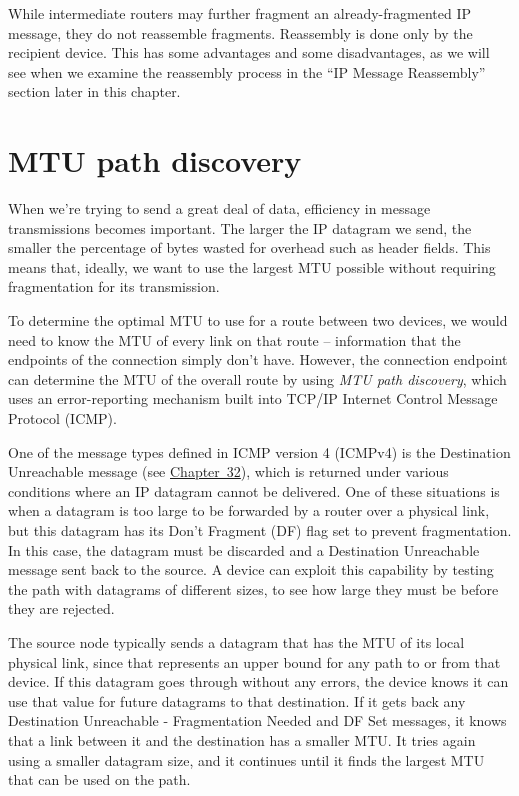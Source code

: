 \begin{note}
While intermediate routers may further fragment an already-fragmented IP message, they do not reassemble fragments.
Reassembly is done only by the recipient device.
This has some advantages and some disadvantages, as we will see when we examine the reassembly process in the ``IP Message Reassembly'' section later in this
chapter.
\end{note}



\section{MTU path discovery}

\protect\hypertarget{ch22.htmlux5cux23idx-CHP-22-0804}{}{}When we're
trying to send a great deal of data, efficiency in message transmissions
becomes important. The larger the IP datagram we send, the smaller the
percentage of bytes wasted for overhead such as header fields. This
means that, ideally, we want to use the largest MTU possible without
requiring fragmentation for its transmission.

To determine the optimal MTU to use for a route between two devices, we
would need to know the MTU of every link on that route -- information
that the endpoints of the connection simply don't have. However, the
connection endpoint can determine the MTU of the overall route by using
{\emph{MTU path discovery}}, which uses an error-reporting mechanism
built into TCP/IP
\protect\hypertarget{ch22.htmlux5cux23idx-CHP-22-0805}{}{}Internet
Control Message Protocol (ICMP).

One of the message types defined in ICMP version 4 (ICMPv4) is the
\protect\hypertarget{ch22.htmlux5cux23idx-CHP-22-0806}{}{}Destination
Unreachable message (see \protect\hyperlink{ch32.html}{Chapter~32}),
which is returned under various conditions where an IP datagram cannot
be delivered. One of these situations is when a datagram is too large to
be forwarded by a router over a physical link, but this datagram has its
Don't Fragment (DF) flag set to prevent fragmentation. In this case, the
datagram must be discarded and a Destination Unreachable message sent
back to the source. A device can exploit this capability by testing the
path with datagrams of different sizes, to see how large they must be
before they are rejected.

The source node typically sends a datagram that has the MTU of its local
physical link, since that represents an upper bound for any path to or
from that device. If this datagram goes through without any errors, the
device knows it can use that value for future datagrams to that
destination. If it gets back any Destination Unreachable - Fragmentation
Needed and DF Set messages, it knows that a link between it and the
destination has a smaller MTU. It tries again using a smaller datagram
size, and it continues until it finds the largest MTU that can be used
on the path.



